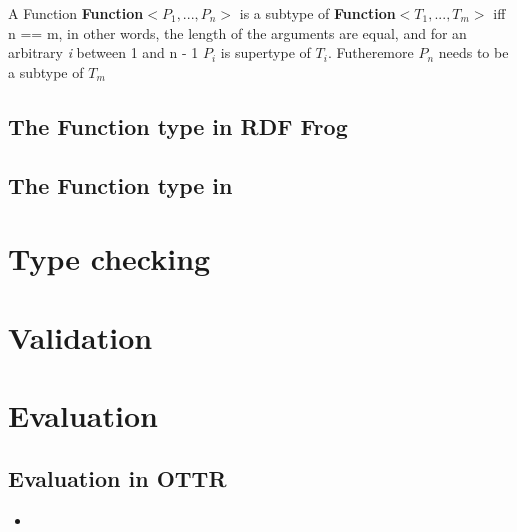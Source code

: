 \para
A Function \textbf{Function$<P_1,...,P_n>$} is a subtype of \textbf{Function$<T_1,...,T_m>$} iff n == m, in other words, the length of the arguments are equal, and for an arbitrary \textit{i} between 1 and n - 1  \textbf{$P_i$} is supertype of \textbf{$T_i$}. Futheremore \textbf{$P_n$} needs to be a subtype of \textbf{$T_m$}

\subsection{The Function type in RDF Frog}

\subsection{The Function type in }

\section{Type checking}

\section{Validation}

\section{Evaluation}

\subsection{Evaluation in OTTR}
\begin{itemize}
    \item 
\end{itemize}



